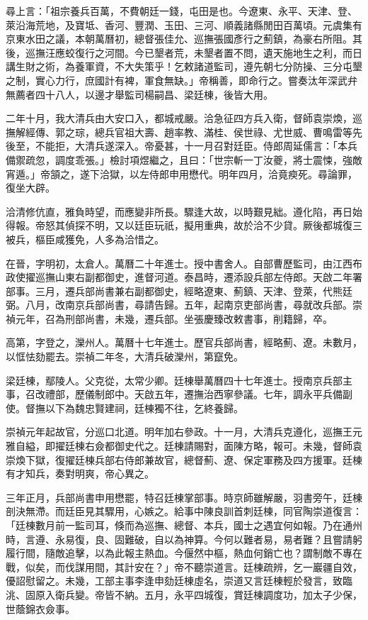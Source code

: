 \begin{pinyinscope}
尋上言：「祖宗養兵百萬，不費朝廷一錢，屯田是也。今遼東、永平、天津、登、萊沿海荒地，及寶坻、香河、豐潤、玉田、三河、順義諸縣閒田百萬頃。元虞集有京東水田之議，本朝萬曆初，總督張佳允、巡撫張國彥行之薊鎮，為豪右所阻。其後，巡撫汪應蛟復行之河間。今已墾者荒，未墾者置不問，遺天施地生之利，而日講生財之術，為養軍資，不大失策乎！乞敕諸道監司，遵先朝七分防操、三分屯墾之制，實心力行，庶國計有裨，軍食無缺。」帝稱善，即命行之。嘗奏汰年深武弁無薦者四十八人，以邊才舉監司楊嗣昌、梁廷棟，後皆大用。

二年十月，我大清兵由大安口入，都城戒嚴。洽急征四方兵入衛，督師袁崇煥，巡撫解經傳、郭之琮，總兵官祖大壽、趙率教、滿桂、侯世祿、尤世威、曹鳴雷等先後至，不能拒，大清兵遂深入。帝憂甚，十一月召對廷臣。侍郎周延儒言：「本兵備禦疏忽，調度乖張。」檢討項煜繼之，且曰：「世宗斬一丁汝夔，將士震悚，強敵宵遁。」帝頷之，遂下洽獄，以左侍郎申用懋代。明年四月，洽竟瘐死。尋論罪，復坐大辟。

洽清修伉直，雅負時望，而應變非所長。驟逢大故，以時艱見絀。遵化陷，再日始得報。帝怒其偵探不明，又以廷臣玩祇，擬用重典，故於洽不少貸。厥後都城復三被兵，樞臣咸獲免，人多為洽惜之。

在晉，字明初，太倉人。萬曆二十年進士。授中書舍人。自部曹歷監司，由江西布政使擢巡撫山東右副都御史，進督河道。泰昌時，遷添設兵部左侍郎。天啟二年署部事。三月，遷兵部尚書兼右副都御史，經略遼東、薊鎮、天津、登萊，代熊廷弼。八月，改南京兵部尚書，尋請告歸。五年，起南京吏部尚書，尋就改兵部。崇禎元年，召為刑部尚書，未幾，遷兵部。坐張慶臻改敕書事，削籍歸，卒。

高第，字登之，灤州人。萬曆十七年進士。歷官兵部尚書，經略薊、遼。未數月，以恇怯劾罷去。崇禎二年冬，大清兵破灤州，第竄免。

梁廷棟，鄢陵人。父克從，太常少卿。廷棟舉萬曆四十七年進士。授南京兵部主事，召改禮部，歷儀制郎中。天啟五年，遷撫治西寧參議。七年，調永平兵備副使。督撫以下為魏忠賢建祠，廷棟獨不往，乞終養歸。

崇禎元年起故官，分巡口北道。明年加右參政。十一月，大清兵克遵化，巡撫王元雅自縊，即擢廷棟右僉都御史代之。廷棟請賜對，面陳方略，報可。未幾，督師袁崇煥下獄，復擢廷棟兵部右侍郎兼故官，總督薊、遼、保定軍務及四方援軍。廷棟有才知兵，奏對明爽，帝心異之。

三年正月，兵部尚書申用懋罷，特召廷棟掌部事。時京師雖解嚴，羽書旁午，廷棟剖決無滯。而廷臣見其驟用，心嫉之。給事中陳良訓首刺廷棟，同官陶崇道復言：「廷棟數月前一監司耳，倏而為巡撫、總督、本兵，國士之遇宜何如報。乃在通州時，言遵、永易復，良、固難破，自以為神算。今何以難者易，易者難？且嘗請躬履行間，隨敵追擊，以為此報主熱血。今偃然中樞，熱血何銷亡也？謂制敵不專在戰，似矣，而伐謀用間，其計安在？」帝不聽崇道言。廷棟疏辨，乞一巖疆自效，優詔慰留之。未幾，工部主事李逢申劾廷棟虛名，崇道又言廷棟輕於發言，致臨洮、固原入衛兵變。帝皆不納。五月，永平四城復，賞廷棟調度功，加太子少保，世蔭錦衣僉事。


\end{pinyinscope}
